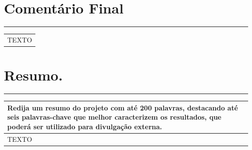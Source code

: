 \documentclass[a4paper,12pt]{article}
\begin{document}
\section{Comentário Final}
\vspace{-0.8cm} %
\rule{\textwidth}{2pt} %
\vspace{-0.9cm} %
\begin{table}[h]
    \begin{longtable}{|p{17.4cm}|} %
     \hline
     \rowcolor{lightgray} 
     \fontsize{8}{10}\selectfont{Acrescente observações relevantes, que não se aplicariam aos outros campos do relatório.}  
     \\ \hline \endhead
     
     \fontsize{10}{12}\selectfont 
     
     
     TEXTO
     
     
     
     \\ \hline
     \end{longtable}
     \end{table}
\newpage
\section{Resumo.\protect\footnotemark[7]}
\vspace{-0.8cm} %
\rule{\textwidth}{2pt} %
\vspace{-0.9cm} %
\begin{table}[h]

    \begin{longtable}{|p{17.4cm}|} %
     \hline
     \rowcolor{lightgray} 
     \fontsize{8}{10}\selectfont \textbf{Redija um resumo do projeto com até 200 palavras, destacando até seis palavras-chave que melhor caracterizem os resultados, que poderá ser utilizado para divulgação externa.}  
     \\ \hline \endfirsthead %
     
     \fontsize{10}{12}\selectfont 
     
     TEXTO
     
     \\ \hline
     \end{longtable}

\end{table}
\newpage
\end{document}
